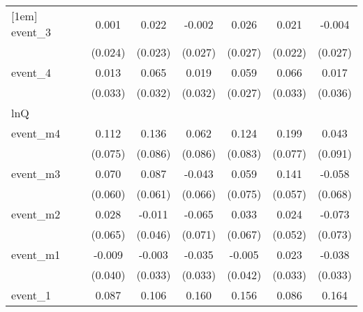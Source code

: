 {\begin{tabular}{l*{6}{c}}
[1em]
event\_3     &       0.001         &       0.022         &      -0.002         &       0.026         &       0.021         &      -0.004         \\
            &     (0.024)         &     (0.023)         &     (0.027)         &     (0.027)         &     (0.022)         &     (0.027)         \\
[1em]
event\_4     &       0.013         &       0.065\sym{*}  &       0.019         &       0.059\sym{*}  &       0.066\sym{*}  &       0.017         \\
            &     (0.033)         &     (0.032)         &     (0.032)         &     (0.027)         &     (0.033)         &     (0.036)         \\
\hline
lnQ         &                     &                     &                     &                     &                     &                     \\
event\_m4    &       0.112         &       0.136         &       0.062         &       0.124         &       0.199\sym{**} &       0.043         \\
            &     (0.075)         &     (0.086)         &     (0.086)         &     (0.083)         &     (0.077)         &     (0.091)         \\
[1em]
event\_m3    &       0.070         &       0.087         &      -0.043         &       0.059         &       0.141\sym{*}  &      -0.058         \\
            &     (0.060)         &     (0.061)         &     (0.066)         &     (0.075)         &     (0.057)         &     (0.068)         \\
[1em]
event\_m2    &       0.028         &      -0.011         &      -0.065         &       0.033         &       0.024         &      -0.073         \\
            &     (0.065)         &     (0.046)         &     (0.071)         &     (0.067)         &     (0.052)         &     (0.073)         \\
[1em]
event\_m1    &      -0.009         &      -0.003         &      -0.035         &      -0.005         &       0.023         &      -0.038         \\
            &     (0.040)         &     (0.033)         &     (0.033)         &     (0.042)         &     (0.033)         &     (0.033)         \\
[1em]
event\_1     &       0.087         &       0.106\sym{*}  &       0.160\sym{*}  &       0.156\sym{*}  &       0.086         &       0.164\sym{*}  \\

\end{tabular}}
